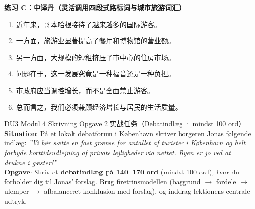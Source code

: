\textbf{练习 C：中译丹（灵活调用四段式路标词与城市旅游词汇）}
\begin{enumerate}
  \item 近年来，哥本哈根接待了越来越多的国际游客。
  \item 一方面，旅游业显著提高了餐厅和博物馆的营业额。
  \item 另一方面，大规模的短租挤压了市中心的住房市场。
  \item 问题在于，这一发展究竟是一种福音还是一种负担。
  \item 市政府应当调控增长，而不是全面禁止游客。
  \item 总而言之，我们必须兼顾经济增长与居民的生活质量。
\end{enumerate}


\begin{emailbox}{DU3 Modul 4 Skrivning Opgave 2 实战任务（Debatindlæg · mindst 100 ord）}
\textbf{Situation}: På et lokalt debatforum i København skriver borgeren Jonas følgende indlæg:\newline
\textit{”Vi bør sætte en fast grænse for antallet af turister i København og helt forbyde korttidsudlejning af private lejligheder via nettet. Byen er jo ved at drukne i gæster!”}\\[3pt]
\textbf{Opgave}: Skriv et \textbf{debatindlæg på 140--170 ord} (mindst 100 ord), hvor du forholder dig til Jonas' forslag. Brug firetrinsmodellen (baggrund $\rightarrow$ fordele $\rightarrow$ ulemper $\rightarrow$ afbalanceret konklusion med forslag), og inddrag lektionens centrale udtryk.
\end{emailbox}

